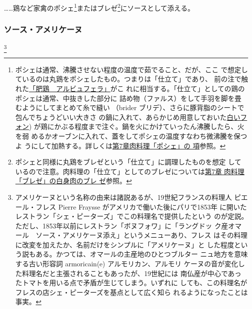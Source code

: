\begin{recette}
\ldots{}\ldots{}鶏など家禽のポシェ\footnote{ポシェは通常、沸騰させない程度の温度で茹でること、だが、ここ
  で想定しているのは丸鶏をポシェしたもの。つまりは「仕立て」であり、
  前の注で触れた\protect\hyperlink{poularde-albufera}{「肥鶏　アルビュフェラ」}がこ
  れに相当する。「仕立て」としての鶏のポシェは通常、中抜きした部分に
  詰め物（ファルス）をして手羽を脚を畳むようにしてまとめて糸で縫い
  （brider ブリデ）、さらに豚背脂のシートで包んでちょうどいい大きさ
  の鍋に入れて、あらかじめ用意しておいた\protect\hyperlink{fonds-blanc}{白いフォン})
  が鶏にかぶる程度まで注ぐ。鍋を火にかけていったん沸騰したら、火を弱
  めるかオーブンに入れて、蓋をしてポシェの温度すなわち微沸騰を保つよ
  うにして加熱する。詳しくは\protect\hyperlink{les-poches}{第7章肉料理「ポシェ」の
  項}参照。}またはブレゼ\footnote{ポシェと同様に丸鶏をブレゼという「仕立て」に調理したものを想定
  しているので注意。肉料理の「仕立て」としてのブレゼについては\protect\hyperlink{les-braisages-de-viandes-blanches}{第7章
  肉料理「ブレゼ」の白身肉のブレ ゼ}参照。}にソースとして添える。

\maeaki

\hypertarget{sauce-americaine}{%
\subsubsection{ソース・アメリケーヌ}\label{sauce-americaine}}

\footnote{アメリケーヌという名称の由来は諸説あるが、19世紀フランスの料理人
  ピエール・フレス Pierre Fraysse がアメリカで働いた後にパリで1853年
  に開いたレストラン「シェ・ピーターズ」でこの料理名で提供したという
  のが定説。ただし、1853年以前にレストラン「ボヌフォワ」に「ラングドッ
  ク産オマール　ソース・アメリケーヌ添え」というメニューあり、フレス
  はその料理に改変を加えたか、名前だけをシンプルに「アメリケーヌ」と
  した程度という説もある。かつては、オマールの主産地のひとつブルター
  ニュ地方を意味する古い形容詞 armoricain(e) アルモリカン、アルモリ
  ケーヌの音が変化した料理名だと主張されることもあったが、19世紀には
  南仏産が中心であったトマトを用いる点で矛盾が生じてしまう。いずれに
  しても、この料理名がフレスの店シェ・ピーターズを基点として広く知ら
  れるようになったことは事実。}



\end{recette}
